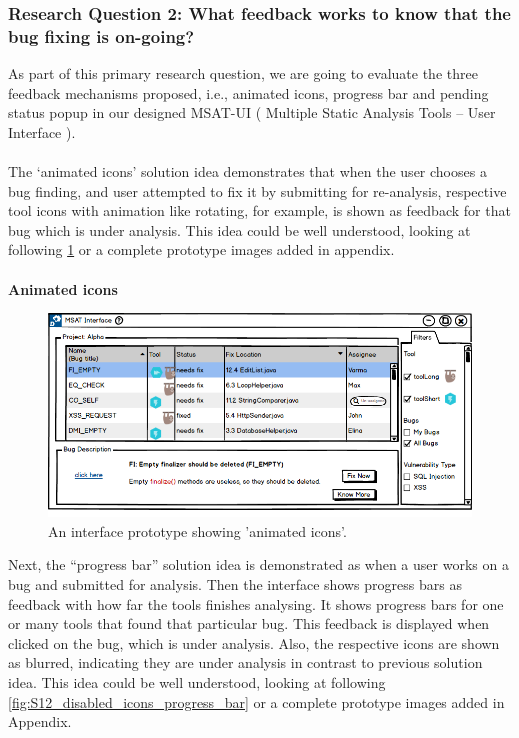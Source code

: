 \subsubsection{Research Question 2: What feedback works to know that the bug fixing is on-going?}

As part of this primary research question, we are going to evaluate the three feedback mechanisms proposed, i.e., animated icons, progress bar and pending status popup in our designed MSAT-UI ( Multiple Static Analysis Tools – User Interface ). \\ \\

The ‘animated icons’ solution idea demonstrates that when the user chooses a bug finding, and user attempted to fix it by submitting for re-analysis,  respective tool icons with animation like rotating, for example, is shown as feedback for that bug which is under analysis. This idea could be well understood, looking at following \ref{fig:S12_animated_icons} or a complete prototype images added in appendix. \\ \\

\textbf{Animated icons}
\begin{figure}[hbt!]
	\centering
	\includegraphics[width=\linewidth]{figures/solution_ideas_snaps/S12_animated_icons}
	\caption{An interface prototype showing 'animated icons'.}
	\label{fig:S12_animated_icons}
\end{figure}

Next, the “progress bar” solution idea is demonstrated as when a user works on a  bug and submitted for analysis.  Then the interface shows progress bars as feedback with how far the tools finishes analysing. It shows progress bars for one or many tools that found that particular bug. This feedback is displayed when clicked on the bug, which is under analysis. Also, the respective icons are shown as blurred, indicating they are under analysis in contrast to previous solution idea. This idea could be well understood, looking at following \ref{fig:S12_disabled_icons_progress_bar} or a complete prototype images added in Appendix. \\ \\

